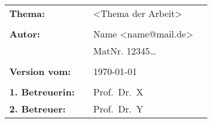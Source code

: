 \begin{flushleft}
    \begin{tabular}{llll}
        \textbf{Thema:}         &  & <Thema der Arbeit>   & \\
                                &  &                        \\
        \textbf{Autor:}         &  & Name <name@mail.de>  & \\
                                &  & MatNr. 12345\ldots{} & \\
                                &  &                        \\
        \textbf{Version vom:}   &  & \today{}             & \\
                                &  &                        \\
        \textbf{1. Betreuerin:} &  & Prof.\ Dr.\ X        & \\
        \textbf{2. Betreuer:}   &  & Prof.\ Dr.\ Y        & \\
    \end{tabular}
\end{flushleft}
